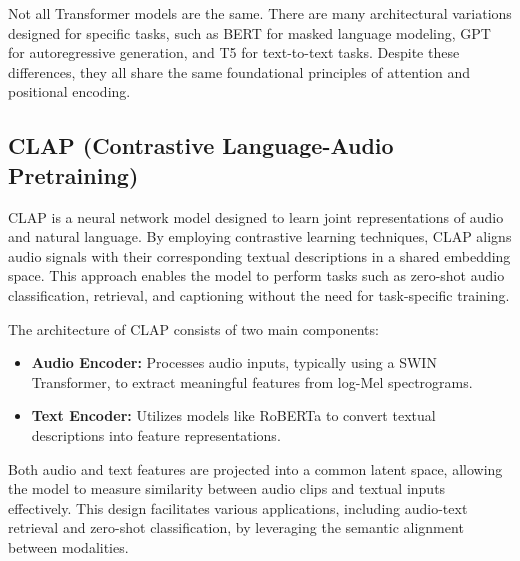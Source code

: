 Not all Transformer models are the same. There are many architectural variations designed for specific tasks, such as BERT for masked language modeling, GPT for autoregressive generation, and T5 for text-to-text tasks. Despite these differences, they all share the same foundational principles of attention and positional encoding.

\subsection{CLAP (Contrastive Language-Audio Pretraining)}

CLAP is a neural network model designed to learn joint representations of audio and natural language. By employing contrastive learning techniques, CLAP aligns audio signals with their corresponding textual descriptions in a shared embedding space. This approach enables the model to perform tasks such as zero-shot audio classification, retrieval, and captioning without the need for task-specific training.

The architecture of CLAP consists of two main components:

\begin{itemize}
    \item \textbf{Audio Encoder:} Processes audio inputs, typically using a SWIN Transformer, to extract meaningful features from log-Mel spectrograms.
    \item \textbf{Text Encoder:} Utilizes models like RoBERTa to convert textual descriptions into feature representations.
\end{itemize}

Both audio and text features are projected into a common latent space, allowing the model to measure similarity between audio clips and textual inputs effectively. This design facilitates various applications, including audio-text retrieval and zero-shot classification, by leveraging the semantic alignment between modalities.
